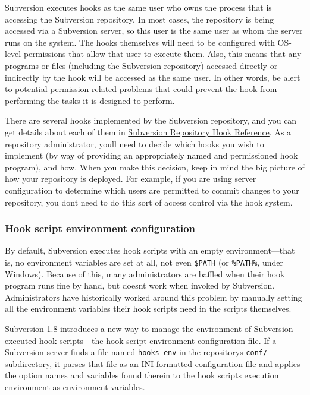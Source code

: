 Subversion executes hooks as the same user who owns the process that is
accessing the Subversion repository. In most cases, the repository is
being accessed via a Subversion server, so this user is the same user as
whom the server runs on the system. The hooks themselves will need to be
configured with OS-level permissions that allow that user to execute
them. Also, this means that any programs or files (including the
Subversion repository) accessed directly or indirectly by the hook will
be accessed as the same user. In other words, be alert to potential
permission-related problems that could prevent the hook from performing
the tasks it is designed to perform.

There are several hooks implemented by the Subversion repository, and
you can get details about each of them in
\hyperref[svn.ref.reposhooks]{Subversion Repository Hook Reference}. As
a repository administrator, you\textquotesingle ll need to decide which
hooks you wish to implement (by way of providing an appropriately named
and permissioned hook program), and how. When you make this decision,
keep in mind the big picture of how your repository is deployed. For
example, if you are using server configuration to determine which users
are permitted to commit changes to your repository, you
don\textquotesingle t need to do this sort of access control via the
hook system.

\subsubsection{Hook script environment
configuration}\label{svn.reposadmin.hooks.configuration}

By default, Subversion executes hook scripts with an empty
environment---that is, no environment variables are set at all, not even
\texttt{\$PATH} (or \texttt{\%PATH\%}, under Windows). Because of this,
many administrators are baffled when their hook program runs fine by
hand, but doesn\textquotesingle t work when invoked by Subversion.
Administrators have historically worked around this problem by manually
setting all the environment variables their hook scripts need in the
scripts themselves.

Subversion 1.8 introduces a new way to manage the environment of
Subversion-executed hook scripts---the hook script environment
configuration file. If a Subversion server finds a file named
\texttt{hooks-env} in the repository\textquotesingle s \texttt{conf/}
subdirectory, it parses that file as an INI-formatted configuration file
and applies the option names and variables found therein to the hook
script\textquotesingle s execution environment as environment variables.

